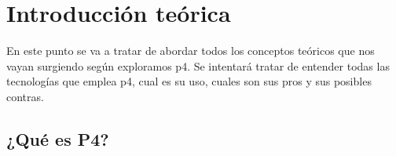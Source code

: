 \section{Introducción teórica}
En este punto se va a tratar de abordar todos los conceptos teóricos que nos vayan surgiendo según exploramos p4. Se intentará tratar de entender todas las tecnologías que emplea p4, cual es su uso, cuales son sus pros y sus posibles contras. 
\subsection{¿Qué es P4?}
